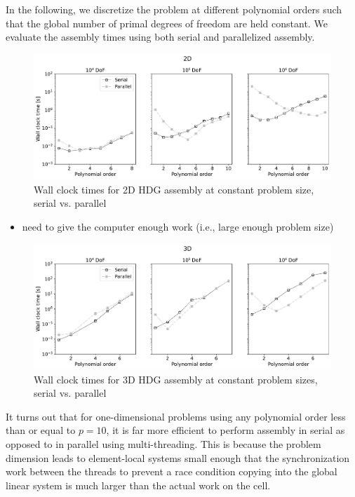 In the following, we discretize the problem at different polynomial orders such that the global number of primal degrees of freedom are held constant.
We evaluate the assembly times using both serial and parallelized assembly.
\begin{figure}[htpb]
  \centering
  \includegraphics[width=0.8\linewidth]{img/assembly_benchmarking_2D.pdf}
  \caption{Wall clock times for 2D HDG assembly at constant problem size, serial vs. parallel}
  \label{fig:assembly_benchmarking_2D}
\end{figure}

\begin{itemize}
  \item need to give the computer enough work (i.e., large enough problem size)
\end{itemize}

\begin{figure}[htpb]
  \centering
  \includegraphics[width=0.8\linewidth]{img/assembly_benchmarking_3D.pdf}
  \caption{Wall clock times for 3D HDG assembly at constant problem sizes, serial vs. parallel}
  \label{fig:assembly_benchmarking_3D}
\end{figure}


It turns out that for one-dimensional problems using any polynomial order less than or equal to $p=10$, it is far more efficient to perform assembly in serial as opposed to in parallel using multi-threading.
This is because the problem dimension leads to element-local systems small enough that the synchronization work between the threads to prevent a race condition copying into the global linear system is much larger than the actual work on the cell.



